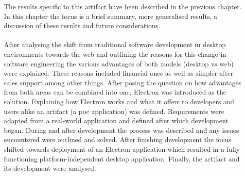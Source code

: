 
The results specific to this artifact have been described in the previous chapter. 
In this chapter the focus is a brief summary, more generalised results, a discussion of these results and 
future considerations.\paragraph{}
After analysing the shift from traditional software development in desktop environments towards
the web and outlining the reasons for this change in software engineering the various advantages 
of both models (desktop vs web) were explained. 
These reasons included financial ones as well as simpler after-sales support among other things.
After posing the question on how advantages from both areas can be combined into one, Electron 
was introduced as the solution. 
Explaining how Electron works and what it offers to developers and users alike an artifact (a 
\acrshort{poc} application) was defined. 
Requirements were adapted from a real-world application and defined after which development began.
During and after development the process was described and any issues encountered were outlined
and solved. 
After finishing development the focus shifted towards deployment of an Electron application
which resulted in a fully functioning platform-independent desktop application. 
Finally, the artifact and its development were analysed.\paragraph{}